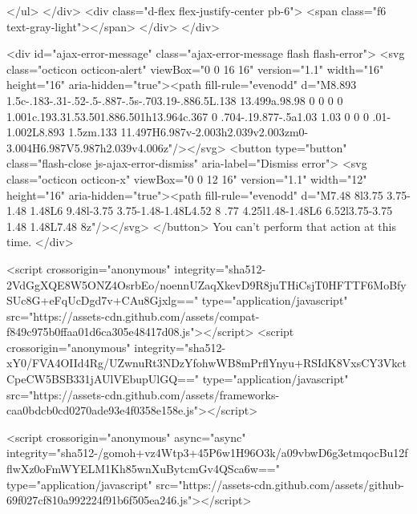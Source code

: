     </ul>
  </div>
  <div class="d-flex flex-justify-center pb-6">
    <span class="f6 text-gray-light"></span>
  </div>
</div>



  <div id="ajax-error-message" class="ajax-error-message flash flash-error">
    <svg class="octicon octicon-alert" viewBox="0 0 16 16" version="1.1" width="16" height="16" aria-hidden="true"><path fill-rule="evenodd" d="M8.893 1.5c-.183-.31-.52-.5-.887-.5s-.703.19-.886.5L.138 13.499a.98.98 0 0 0 0 1.001c.193.31.53.501.886.501h13.964c.367 0 .704-.19.877-.5a1.03 1.03 0 0 0 .01-1.002L8.893 1.5zm.133 11.497H6.987v-2.003h2.039v2.003zm0-3.004H6.987V5.987h2.039v4.006z"/></svg>
    <button type="button" class="flash-close js-ajax-error-dismiss" aria-label="Dismiss error">
      <svg class="octicon octicon-x" viewBox="0 0 12 16" version="1.1" width="12" height="16" aria-hidden="true"><path fill-rule="evenodd" d="M7.48 8l3.75 3.75-1.48 1.48L6 9.48l-3.75 3.75-1.48-1.48L4.52 8 .77 4.25l1.48-1.48L6 6.52l3.75-3.75 1.48 1.48L7.48 8z"/></svg>
    </button>
    You can’t perform that action at this time.
  </div>


    <script crossorigin="anonymous" integrity="sha512-2VdGgXQE8W5ONZ4OsrbEo/noennUZaqXkevD9R8juTHiCsjT0HFTTF6MoBfySUc8G+eFqUcDgd7v+CAu8Gjxlg==" type="application/javascript" src="https://assets-cdn.github.com/assets/compat-f849c975b0ffaa01d6ca305e48417d08.js"></script>
    <script crossorigin="anonymous" integrity="sha512-xY0/FVA4OIId4Rg/UZwnuRt3NDzYfohwWB8mPrflYnyu+RSIdK8VxsCY3VkctCpeCW5BSB331jAUlVEbupUlGQ==" type="application/javascript" src="https://assets-cdn.github.com/assets/frameworks-caa0bdcb0cd0270ade93e4f0358e158e.js"></script>
    
    <script crossorigin="anonymous" async="async" integrity="sha512-/gomoh+vz4Wtp3+45P6w1H96O3k/a09vbwD6g3etmqocBu12fflwXz0oFmWYELM1Kh85wnXuBytcmGv4QSca6w==" type="application/javascript" src="https://assets-cdn.github.com/assets/github-69f027cf810a992224f91b6f505ea246.js"></script>
    
    
    
